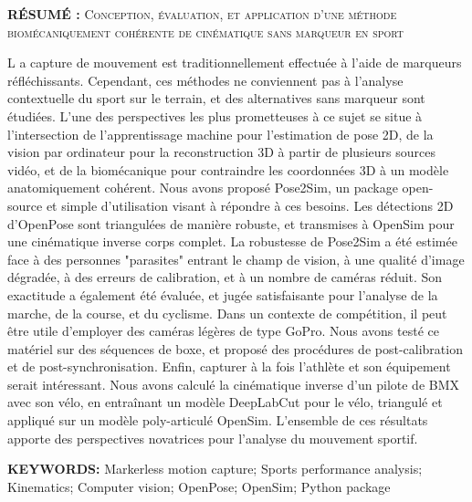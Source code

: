 \vspace*{1cm}

\noindent\textbf{RÉSUMÉ : } \textsc{Conception, évaluation, et application d’une méthode biomécaniquement cohérente de cinématique sans marqueur en sport}

\lettrine[lines=1]{L}{ }a capture de mouvement est traditionnellement effectuée à l'aide de marqueurs réfléchissants. Cependant, ces méthodes ne conviennent pas à l'analyse contextuelle du sport sur le terrain, et des alternatives sans marqueur sont étudiées. L'une des perspectives les plus prometteuses à ce sujet se situe à l'intersection de l'apprentissage machine pour l'estimation de pose 2D, de la vision par ordinateur pour la reconstruction 3D à partir de plusieurs sources vidéo, et de la biomécanique pour contraindre les coordonnées 3D à un modèle anatomiquement cohérent. Nous avons proposé Pose2Sim, un package open-source et simple d'utilisation visant à répondre à ces besoins. Les détections 2D d'OpenPose sont triangulées de manière robuste, et transmises à OpenSim pour une cinématique inverse corps complet. La robustesse de Pose2Sim a été estimée face à des personnes "parasites" entrant le champ de vision, à une qualité d'image dégradée, à des erreurs de calibration, et à un nombre de caméras réduit. Son exactitude a également été évaluée, et jugée satisfaisante pour l'analyse de la marche, de la course, et du cyclisme. Dans un contexte de compétition, il peut être utile d'employer des caméras légères de type GoPro. Nous avons testé ce matériel sur des séquences de boxe, et proposé des procédures de post-calibration et de post-synchronisation. Enfin, capturer à la fois l'athlète et son équipement serait intéressant. Nous avons calculé la cinématique inverse d'un pilote de BMX avec son vélo, en entraînant un modèle DeepLabCut pour le vélo, triangulé et appliqué sur un modèle poly-articulé OpenSim. L'ensemble de ces résultats apporte des perspectives novatrices pour l'analyse du mouvement sportif.

\vspace*{1cm}
\noindent\textbf{KEYWORDS:} Markerless motion capture; Sports performance analysis; Kinematics; Computer vision; OpenPose; OpenSim; Python package






